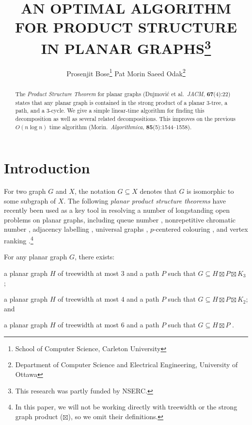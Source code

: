 \documentclass{patmorin}
\title{\MakeUppercase{An Optimal Algorithm for Product Structure in Planar Graphs}\thanks{This research was partly funded by NSERC.}}
\author{%
  Prosenjit Bose\thanks{School of Computer Science, Carleton University}\qquad
  Pat Morin\footnotemark[1]\qquad
  Saeed Odak\thanks{Department of Computer Science and Electrical Engineering, University of Ottawa}}
\date{}
\begin{document}
\maketitle

\begin{abstract}
  The \emph{Product Structure Theorem} for planar graphs (Dujmović et al.\ \emph{JACM}, \textbf{67}(4):22) states that any planar graph is contained in the strong product of a planar $3$-tree, a path, and a $3$-cycle.  We give a simple linear-time algorithm for finding this decomposition as well as several related decompositions.  This improves on the previous $O(n\log n)$ time algorithm (Morin.\ \emph{Algorithmica}, \textbf{85}(5):1544--1558).
\end{abstract}

%

\section{Introduction}

For two graph $G$ and $X$, the notation $G\subseteq X$ denotes that $G$ is isomorphic to some subgraph of $X$.
The following \emph{planar product structure theorems} have recently been used as a key tool in resolving a number of longstanding open problems on planar graphs, including queue number \cite{dujmovic.joret.ea:planar}, nonrepetitive chromatic number \cite{dujmovic.esperet.ea:planar}, adjacency labelling \cite{dujmovic.esperet.ea:adjacency}, universal graphs \cite{esperet.joret.ea:sparse}, $p$-centered colouring \cite{debski.felsner.ea:improved}, and vertex ranking \cite{bose.dujmovic.ea:asymptotically}.\footnote{In this paper, we will not be working directly with treewidth or the strong graph product ($\boxtimes$), so we omit their definitions.}

\begin{thm}\label{meta}
  For any planar graph $G$, there exists:
  \begin{compactenum}[(a)]
    \item \label{three_tree} a planar graph $H$ of treewidth at most $3$ and a path $P$ such that $G\subseteq H\boxtimes P\boxtimes K_3$ \cite{dujmovic.joret.ea:planar};
    \item \label{four_tree} a planar graph $H$ of treewidth at most $4$ and a path $P$ such that $G\subseteq H\boxtimes P\boxtimes K_2$; and
    \item \label{six_tree} a planar graph $H$ of treewidth at most $6$ and a path $P$ such that $G\subseteq H\boxtimes P$ \cite{ueckerdt.wood.ea:improved}.
  \end{compactenum}
\end{thm}
\end{document}
